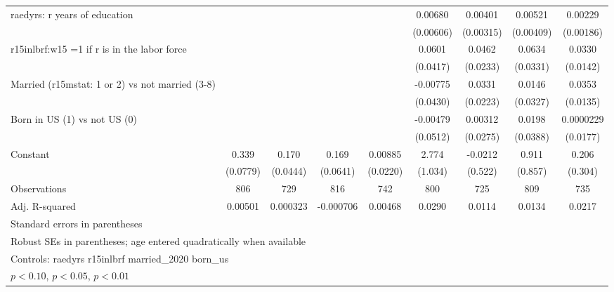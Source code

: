\begin{table}[htbp]
\begin{tabular}{l*{8}{c}}
\addlinespace
raedyrs: r years of education&                  &                  &                  &                  &  0.00680         &  0.00401         &  0.00521         &  0.00229         \\
                &                  &                  &                  &                  &(0.00606)         &(0.00315)         &(0.00409)         &(0.00186)         \\
\addlinespace
r15inlbrf:w15 =1 if r is in the labor force&                  &                  &                  &                  &   0.0601         &   0.0462\sym{**} &   0.0634\sym{*}  &   0.0330\sym{**} \\
                &                  &                  &                  &                  & (0.0417)         & (0.0233)         & (0.0331)         & (0.0142)         \\
\addlinespace
Married (r15mstat: 1 or 2) vs not married (3-8)&                  &                  &                  &                  & -0.00775         &   0.0331         &   0.0146         &   0.0353\sym{***}\\
                &                  &                  &                  &                  & (0.0430)         & (0.0223)         & (0.0327)         & (0.0135)         \\
\addlinespace
Born in US (1) vs not US (0)&                  &                  &                  &                  & -0.00479         &  0.00312         &   0.0198         &0.0000229         \\
                &                  &                  &                  &                  & (0.0512)         & (0.0275)         & (0.0388)         & (0.0177)         \\
\addlinespace
Constant        &    0.339\sym{***}&    0.170\sym{***}&    0.169\sym{***}&  0.00885         &    2.774\sym{***}&  -0.0212         &    0.911         &    0.206         \\
                & (0.0779)         & (0.0444)         & (0.0641)         & (0.0220)         &  (1.034)         &  (0.522)         &  (0.857)         &  (0.304)         \\
\midrule
Observations    &      806         &      729         &      816         &      742         &      800         &      725         &      809         &      735         \\
Adj. R-squared  &  0.00501         & 0.000323         &-0.000706         &  0.00468         &   0.0290         &   0.0114         &   0.0134         &   0.0217         \\
\bottomrule
\multicolumn{9}{l}{\footnotesize Standard errors in parentheses}\\
\multicolumn{9}{l}{\footnotesize Robust SEs in parentheses; age entered quadratically when available}\\
\multicolumn{9}{l}{\footnotesize Controls:  raedyrs r15inlbrf married\_2020 born\_us}\\
\multicolumn{9}{l}{\footnotesize \sym{*} \(p<0.10\), \sym{**} \(p<0.05\), \sym{***} \(p<0.01\)}\\
\end{tabular}
\end{table}
